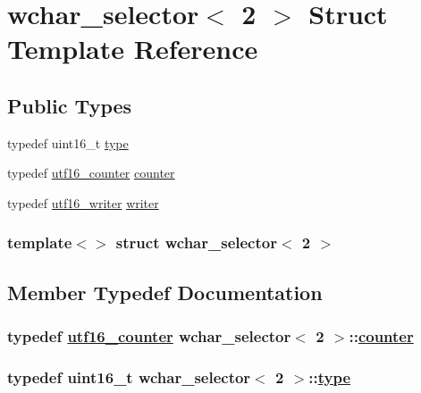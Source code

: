 \hypertarget{structwchar__selector_3_012_01_4}{
\section{wchar\_\-selector$<$ 2 $>$ Struct Template Reference}
\label{structwchar__selector_3_012_01_4}
}
\subsection*{Public Types}
\begin{CompactItemize}
\item 
typedef uint16\_\-t \hyperlink{structwchar__selector_3_012_01_4_60517f9b159ad60977ca7c3d2739c168}{type}
\item 
typedef \hyperlink{structutf16__counter}{utf16\_\-counter} \hyperlink{structwchar__selector_3_012_01_4_108682c81b16127f3bec2501f02cb9d8}{counter}
\item 
typedef \hyperlink{structutf16__writer}{utf16\_\-writer} \hyperlink{structwchar__selector_3_012_01_4_f84979f9b8cd883798fe4e99820d6073}{writer}
\end{CompactItemize}
\subsubsection*{template$<$$>$ struct wchar\_\-selector$<$ 2 $>$}



\subsection{Member Typedef Documentation}
\hypertarget{structwchar__selector_3_012_01_4_108682c81b16127f3bec2501f02cb9d8}{
\subsubsection[counter]{\setlength{\rightskip}{0pt plus 5cm}typedef \hyperlink{structutf16__counter}{utf16\_\-counter} wchar\_\-selector$<$ 2 $>$::\hyperlink{structutf16__counter}{counter}}}
\label{structwchar__selector_3_012_01_4_108682c81b16127f3bec2501f02cb9d8}


\hypertarget{structwchar__selector_3_012_01_4_60517f9b159ad60977ca7c3d2739c168}{
\subsubsection[type]{\setlength{\rightskip}{0pt plus 5cm}typedef uint16\_\-t wchar\_\-selector$<$ 2 $>$::\hyperlink{structwchar__selector_3_012_01_4_60517f9b159ad60977ca7c3d2739c168}{type}}}
\label{structwchar__selector_3_012_01_4_60517f9b159ad60977ca7c3d2739c168}


